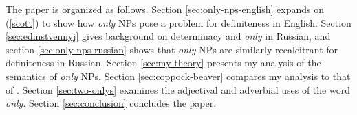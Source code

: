 
The paper is organized as follows. Section \ref{sec:only-nps-english} expands on (\ref{scott}) to show how \textit{only} NPs pose a problem for definiteness in English. Section \ref{sec:edinstvennyj} gives background on determinacy and \textit{only} in Russian, and section \ref{sec:only-nps-russian} shows that \textit{only} NPs are similarly recalcitrant for definiteness in Russian. Section \ref{sec:my-theory} presents my analysis of the semantics of \textit{only} NPs. Section \ref{sec:coppock-beaver} compares my analysis to that of \citet{cb2015}. Section \ref{sec:two-onlys} examines the adjectival and adverbial uses of the word \textit{only}. Section \ref{sec:conclusion} concludes the paper.